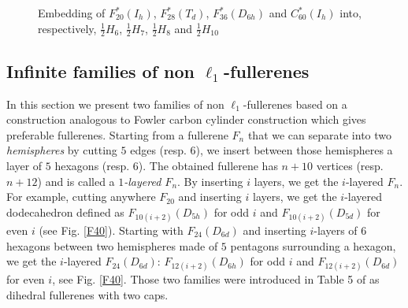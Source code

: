 \clearpage

\begin{figure}[phtb]
\begin{center}
\caption{Embedding of $F^*_{20}(I_h)$, $F^*_{28}(T_d)$, $F_{36}^*(D_{6h})$ and $C_{60}^*(I_h)$ into, respectively, 
$\frac{1}{2}H_{6}$, 
$\frac{1}{2}H_{7}$,
$\frac{1}{2}H_{8}$
and $\frac{1}{2}H_{10}$}\label{embeddingofdualC60}
\end{center}
\end{figure}

\clearpage

\subsection{Infinite families of non $\ell_1$-fullerenes}
In this section we present two families of non $\ell_1$-fullerenes based on a construction
analogous to {\sc Fowler} \cite{atlas} carbon cylinder construction which gives preferable fullerenes. 
Starting
from a fullerene $F_n$ that we can separate into two {\it hemispheres} by cutting $5$ edges 
(resp. $6$), we insert between those hemispheres a layer of $5$ hexagons (resp. $6$). The obtained
fullerene has $n+10$ vertices (resp. $n+12$) and is called a {\it $1$-layered $F_n$}. By inserting
$i$ layers, we get the $i$-layered $F_n$. 
For example, cutting anywhere $F_{20}$
and inserting $i$ layers, we get the $i$-layered dodecahedron defined
as $F_{10(i+2)}(D_{5h})$ for odd $i$ and $F_{10(i+2)}(D_{5d})$ for even $i$ (see Fig. \ref{F40}).
Starting with 
$F_{24}(D_{6d})$ and inserting $i$-layers of $6$ hexagons between two hemispheres made of
$5$ pentagons surrounding a hexagon, we get the $i$-layered $F_{24}(D_{6d})$: $F_{12(i+2)}(D_{6h})$
for odd $i$ and $F_{12(i+2)}(D_{6d})$ for even $i$, see Fig. \ref{F40}.
Those two families were introduced in Table 5 of \cite{fow87} as dihedral 
fullerenes with two caps.

